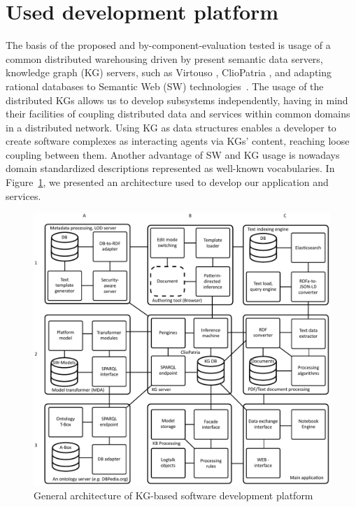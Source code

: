 \documentclass[
]{aiitart}
\begin{document}
\section{Used development platform}

The basis of the proposed and by-component-evaluation tested is usage of a common distributed warehousing driven by present semantic data servers, knowledge graph (KG) \cite{kg} servers, such as Virtouso \cite{virtuoso}, ClioPatria \cite{b8}, and adapting rational databases to Semantic Web (SW) technologies~\cite{tbl}.  The usage of the distributed KGs allows us to develop subsystems independently, having in mind their facilities of coupling distributed data and services within common domains in a distributed network.  Using KG as data structures enables a developer to create software complexes as interacting agents via KGs' content, reaching loose coupling between them.  Another advantage of SW and KG usage is nowadays domain standardized descriptions represented as well-known vocabularies.  In Figure~\ref{fig:arch}, we presented an architecture used to develop our application and services.

\begin{figure}
\centering
\includegraphics[width=1\linewidth]{architecture-mda-lod-ext-general.pdf}
\caption{General architecture of KG-based software development platform}
\label{fig:arch}
\end{figure}
\end{document}
